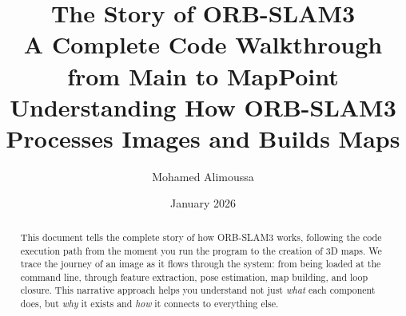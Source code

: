 \documentclass[11pt,a4paper]{article}
\title{\textbf{The Story of ORB-SLAM3}\\
\large{A Complete Code Walkthrough from Main to MapPoint}\\[1em]
\normalsize{Understanding How ORB-SLAM3 Processes Images and Builds Maps}}
\author{Mohamed Alimoussa}
\date{January 2026}
\begin{document}
\maketitle

\begin{abstract}
This document tells the complete story of how ORB-SLAM3 works, following the code execution path from the moment you run the program to the creation of 3D maps. We trace the journey of an image as it flows through the system: from being loaded at the command line, through feature extraction, pose estimation, map building, and loop closure. This narrative approach helps you understand not just \textit{what} each component does, but \textit{why} it exists and \textit{how} it connects to everything else.
\end{abstract}

\tableofcontents
\newpage










\appendix


\end{document}
